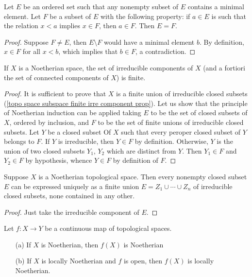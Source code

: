 \begin{lemma}\label{topo Noe induction principle}
Let $E$ be an ordered set such that any nonempty subset of $E$ contains a minimal element. Let $F$ be a subset of $E$ with the following property: if $a\in E$ is such that the relation $x<a$ implies $x\in F$, then $a\in F$. Then $E=F$.
\end{lemma}
\begin{proof}
Suppose $F\neq E$, then $E\setminus F$ would have a minimal element $b$. By definition, $x\in F$ for all $x<b$, which implies that $b\in F$, a contradiction.
\end{proof}
\begin{proposition}\label{topo space Noe finite irreducible componenet}
If $X$ is a Noetherian space, the set of irreducible components of $X$ (and a fortiori the set of connected components of $X$) is finite.
\end{proposition}
\begin{proof}
It is sufficient to prove that $X$ is a finite union of irreducible closed subsets (\cref{topo space subspace finite irre component prop}). Let us show that the principle of Noetherian induction can be applied taking $E$ to be the set of closed subsets of $X$, ordered by inclusion, and $F$ to be the set of finite unions of irreducible closed subsets. Let $Y$ be a closed subset Of $X$ such that every peroper closed subset of $Y$ belongs to $F$. If $Y$ is irreducible, then $Y\in F$ by definition. Otherwise, $Y$ is the union of two closed subsets $Y_1$, $Y_2$ which are distinct from $Y$. Then $Y_1\in F$ and $Y_2\in F$ by hypothesis, whence $Y\in F$ by definition of $F$.
\end{proof}
\begin{proposition}\label{topo Noe irreducible decomp}
Suppose $X$ is a Noetherian topological space. Then every nonempty closed subset $E$ can be expressed uniquely as a finite union $E=Z_1\cup\cdots\cup Z_n$ of irreducible closed subsets, none contained in any other.
\end{proposition}
\begin{proof}
Just take the irreducible component of $E$.
\end{proof}
\begin{proposition}\label{topo space Noe under continuous map}
Let $f:X\to Y$ be a continuous map of topological spaces.
\begin{itemize}
\item[(a)] If $X$ is Noetherian, then $f(X)$ is Noetherian
\item[(b)] If $X$ is locally Noetherian and $f$ is open, then $f(X)$ is locally Noetherian.
\end{itemize}
\end{proposition}
